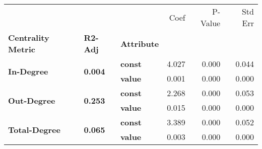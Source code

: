 \begin{tabular}{lllrrr}
\toprule
             &       &       &  Coef &  P-Value &  Std Err \\
\textbf{Centrality Metric} & \textbf{R2-Adj} & \textbf{Attribute} &       &          &          \\
\midrule
\multirow{2}{*}{\textbf{In-Degree}} & \multirow{2}{*}{\textbf{0.004}} & \textbf{const} & 4.027 &    0.000 &    0.044 \\
             &       & \textbf{value} & 0.001 &    0.000 &    0.000 \\
\cline{1-6}
\cline{2-6}
\multirow{2}{*}{\textbf{Out-Degree}} & \multirow{2}{*}{\textbf{0.253}} & \textbf{const} & 2.268 &    0.000 &    0.053 \\
             &       & \textbf{value} & 0.015 &    0.000 &    0.000 \\
\cline{1-6}
\cline{2-6}
\multirow{2}{*}{\textbf{Total-Degree}} & \multirow{2}{*}{\textbf{0.065}} & \textbf{const} & 3.389 &    0.000 &    0.052 \\
             &       & \textbf{value} & 0.003 &    0.000 &    0.000 \\
\bottomrule
\end{tabular}
